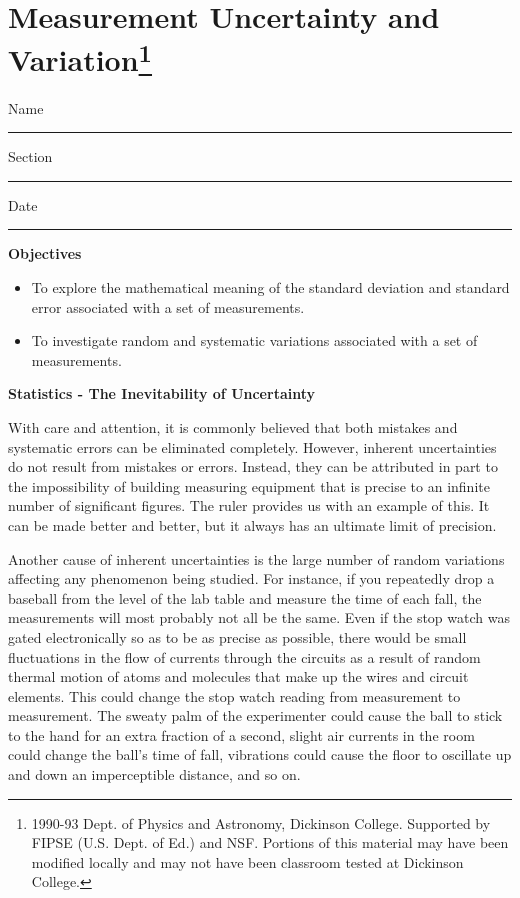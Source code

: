 
\section{Measurement Uncertainty and Variation\footnote{
1990-93 Dept. of Physics and Astronomy, Dickinson College. Supported by FIPSE
(U.S. Dept. of Ed.) and NSF. Portions of this material may have been modified
locally and may not have been classroom tested at Dickinson College.
}}

Name \rule{2.0in}{0.1pt}\hfill{}Section \rule{1.0in}{0.1pt}\hfill{}Date \rule{1.0in}{0.1pt}

\textbf{Objectives }

\begin{itemize}
\item To explore the mathematical meaning of the standard deviation and standard error
associated with a set of measurements. 
\item To investigate random and systematic variations associated with a set of measurements.
\end{itemize}
\textbf{Statistics - The Inevitability of Uncertainty }

With care and attention, it is commonly believed that both mistakes and systematic
errors can be eliminated completely. However, inherent uncertainties do not
result from mistakes or errors. Instead, they can be attributed in part to the
impossibility of building measuring equipment that is precise to an infinite
number of significant figures. The ruler provides us with an example of this.
It can be made better and better, but it always has an ultimate limit of precision.

Another cause of inherent uncertainties is the large number of random variations
affecting any phenomenon being studied. For instance, if you repeatedly drop
a baseball from the level of the lab table and measure the time of each fall,
the measurements will most probably not all be the same. Even if the stop watch
was gated electronically so as to be as precise as possible, there would be
small fluctuations in the flow of currents through the circuits as a result
of random thermal motion of atoms and molecules that make up the wires and circuit
elements. This could change the stop watch reading from measurement to measurement.
The sweaty palm of the experimenter could cause the ball to stick to the hand
for an extra fraction of a second, slight air currents in the room could change
the ball's time of fall, vibrations could cause the floor to oscillate up and
down an imperceptible distance, and so on.

